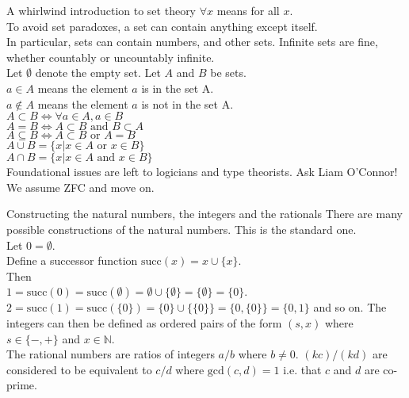 \documentclass{beamer}
\begin{document}


\begin{frame}{A whirlwind introduction to set theory}
$\forall x$ means for all $x$.\\
To avoid set paradoxes, a set can contain anything except itself.\\
In particular, sets can contain numbers, and other sets. Infinite sets are fine, whether countably
or uncountably infinite.\\
Let $\emptyset$ denote the empty set.
Let $A$ and $B$ be sets.\\
$a \in A$ means the element $a$ is in the set A.\\
$a \notin A$ means the element $a$ is not in the set A.\\
$A \subset B \Leftrightarrow \forall a \in A, a \in B$\\
$A = B \Leftrightarrow A \subset B \text{ and } B \subset A$\\
$A \subseteq B \Leftrightarrow A \subset B \text{ or } A = B$\\
$A \cup B = \{x | x \in A \text{ or } x \in B\}$\\
$A \cap B = \{x | x \in A \text{ and } x \in B\}$\\
Foundational issues are left to logicians and type theorists. Ask Liam O'Connor! We assume ZFC and move on.
\end{frame}

\def \succ {\text{succ}}
\begin{frame}{Constructing the natural numbers, the integers and the rationals}
There are many possible constructions of the natural numbers. This is the standard one.\\
Let $0 = \emptyset$. \\
Define a successor function $\succ{(x)} = x \cup \{ x \}$.\\
Then\\
$1 = \succ(0) = \succ(\emptyset) = \emptyset \cup \{ \emptyset \} = \{\emptyset\} = \{ 0 \}$.\\
$2 = \succ(1) = \succ(\{ 0 \}) = \{ 0 \} \cup \{ \{ 0 \} \} = \{ 0, \{ 0 \} \} = \{0, 1\}$ and so on.
The integers can then be defined as ordered pairs of the form $(s, x)$ where $s \in \{-, +\}$ and
$x \in \mathbb{N}$. \\
The rational numbers are ratios of integers $a / b$ where $b \ne 0$.
$(k c) / (k d)$ are considered to be equivalent to $c / d$ where $\text{gcd}(c, d) = 1$ i.e. that $c$ and $d$
are co-prime.
\end{frame}
\end{document}
